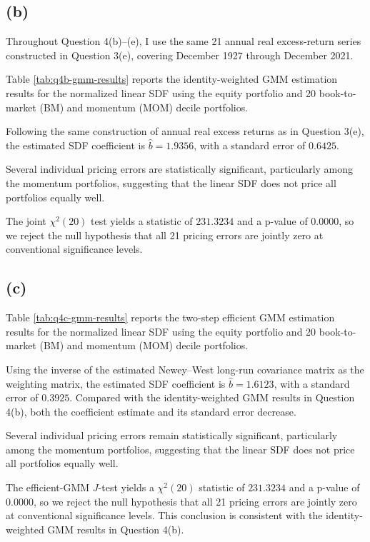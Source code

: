 \documentclass[11pt]{article}
\begin{document}
\clearpage
\subsection*{(b)}
Throughout Question 4(b)–(e), I use the same 21 annual real excess-return series constructed in Question 3(e), covering December 1927 through December 2021.

Table \ref{tab:q4b-gmm-results} reports the identity-weighted GMM estimation results for the normalized linear SDF using the equity portfolio and 20 book-to-market (BM) and momentum (MOM) decile portfolios.

Following the same construction of annual real excess returns as in Question 3(e), the estimated SDF coefficient is \(\hat b=1.9356\), with a standard error of \(0.6425\).

Several individual pricing errors are statistically significant, particularly among the momentum portfolios, suggesting that the linear SDF does not price all portfolios equally well.

The joint \(\chi^2(20)\) test yields a statistic of \(231.3234\) and a p-value of \(0.0000\), so we reject the null hypothesis that all 21 pricing errors are jointly zero at conventional significance levels.


\FloatBarrier

\clearpage
\subsection*{(c)}
Table \ref{tab:q4c-gmm-results} reports the two-step efficient GMM estimation results for the normalized linear SDF using the equity portfolio and 20 book-to-market (BM) and momentum (MOM) decile portfolios.

Using the inverse of the estimated Newey–West long-run covariance matrix as the weighting matrix, the estimated SDF coefficient is \(\hat b=1.6123\), with a standard error of \(0.3925\). Compared with the identity-weighted GMM results in Question 4(b), both the coefficient estimate and its standard error decrease.

Several individual pricing errors remain statistically significant, particularly among the momentum portfolios, suggesting that the linear SDF does not price all portfolios equally well.

The efficient-GMM \(J\)-test yields a \(\chi^2(20)\) statistic of \(231.3234\) and a p-value of \(0.0000\), so we reject the null hypothesis that all 21 pricing errors are jointly zero at conventional significance levels. This conclusion is consistent with the identity-weighted GMM results in Question 4(b).

\end{document}
